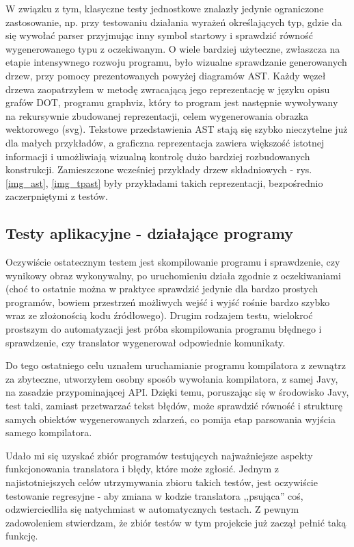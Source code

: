 W związku z tym, klasyczne testy jednostkowe znalazły jedynie ograniczone zastosowanie, np. przy testowaniu działania wyrażeń określających typ, gdzie da się wywołać parser przyjmując inny symbol startowy i sprawdzić równość wygenerowanego typu z oczekiwanym. O wiele bardziej użyteczne, zwłaszcza na etapie intensywnego rozwoju programu, było wizualne sprawdzanie generowanych drzew, przy pomocy prezentowanych powyżej diagramów AST. Każdy węzeł drzewa zaopatrzyłem w metodę zwracającą jego reprezentację w języku opisu grafów DOT, programu graphviz, który to program jest następnie wywoływany na rekursywnie zbudowanej reprezentacji, celem wygenerowania obrazka wektorowego (svg). Tekstowe przedstawienia AST stają się szybko nieczytelne już dla małych przykładów, a graficzna reprezentacja zawiera większość istotnej informacji i umożliwiają wizualną kontrolę dużo bardziej rozbudowanych konstrukcji. Zamieszczone wcześniej przykłady drzew składniowych - rys. \ref{img_ast}, \ref{img_tpast} były przykładami takich reprezentacji, bezpośrednio zaczerpniętymi z testów.

\subsection{Testy aplikacyjne - działające programy}
Oczywiście ostatecznym testem jest skompilowanie programu i sprawdzenie, czy wynikowy obraz wykonywalny, po uruchomieniu działa zgodnie z oczekiwaniami (choć to ostatnie można w praktyce sprawdzić jedynie dla bardzo prostych programów, bowiem przestrzeń możliwych wejść i wyjść rośnie bardzo szybko wraz ze złożonością kodu źródłowego). Drugim rodzajem testu, wielokroć prostszym do automatyzacji jest próba skompilowania programu błędnego i sprawdzenie, czy translator wygenerował odpowiednie komunikaty.

Do tego ostatniego celu uznałem uruchamianie programu kompilatora z zewnątrz za zbyteczne, utworzyłem osobny sposób wywołania kompilatora, z samej Javy, na zasadzie przypominającej API. Dzięki temu, poruszając się w środowisko Javy, test taki, zamiast przetwarzać tekst błędów, może sprawdzić równość i strukturę samych obiektów wygenerowanych zdarzeń, co pomija etap parsowania wyjścia samego kompilatora.

Udało mi się uzyskać zbiór programów testujących najważniejsze aspekty funkcjonowania translatora i błędy, które może zgłosić. Jednym z najistotniejszych celów utrzymywania zbioru takich testów, jest oczywiście testowanie regresyjne - aby zmiana w kodzie translatora ,,psująca'' coś, odzwierciedliła się natychmiast w automatycznych testach. Z pewnym zadowoleniem stwierdzam, że zbiór testów w tym projekcie już zaczął pełnić taką funkcję.

